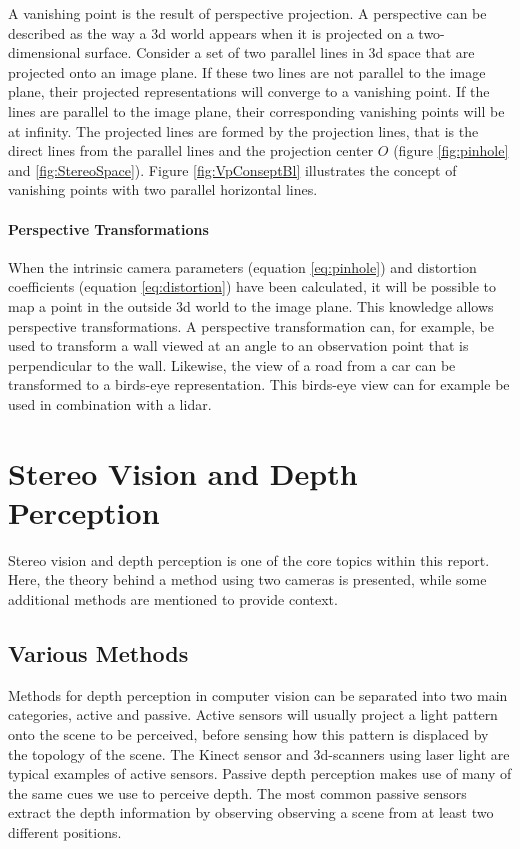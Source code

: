 A vanishing point is the result of perspective projection. A perspective can be described as the way a 3d world appears when it is projected on a two-dimensional surface. Consider a set of two parallel lines in 3d space that are projected onto an image plane. If these two lines are not parallel to the image plane, their projected representations will converge to a vanishing point. If the lines are parallel to the image plane, their corresponding vanishing points will be at infinity. The projected lines are formed by the projection lines, that is the direct lines from the parallel lines and the projection center $O$ (figure \ref{fig:pinhole} and \ref{fig:StereoSpace}). Figure \ref{fig:VpConseptBl} illustrates the concept of vanishing points with two parallel horizontal lines.

\paragraph{Perspective Transformations}

When the intrinsic camera parameters (equation \eqref{eq:pinhole}) and distortion coefficients (equation \ref{eq:distortion}) have been calculated, it will be possible to map a point in the outside 3d world to the image plane. This knowledge allows perspective transformations. A perspective transformation can, for example, be used to transform a wall viewed at an angle to an observation point that is perpendicular to the wall. Likewise, the view of a road from a car can be transformed to a birds-eye representation. This birds-eye view can for example be used in combination with a \gls{lidar}\cite{oreillycv}.

\section{Stereo Vision and Depth Perception}

Stereo vision and depth perception is one of the core topics within this report. Here, the theory behind a method using two cameras is presented, while some additional methods are mentioned to provide context. 

\subsection{Various Methods}

Methods for depth perception in computer vision can be separated into two main categories, active and passive\cite{autorobot}. Active sensors will usually project a light pattern onto the scene to be perceived, before sensing how this pattern is displaced by the topology of the scene. The Kinect sensor and 3d-scanners using laser light are typical examples of active sensors. Passive depth perception makes use of many of the same cues we use to perceive depth. The most common passive sensors extract the depth information by observing observing a scene from at least two different positions. 

